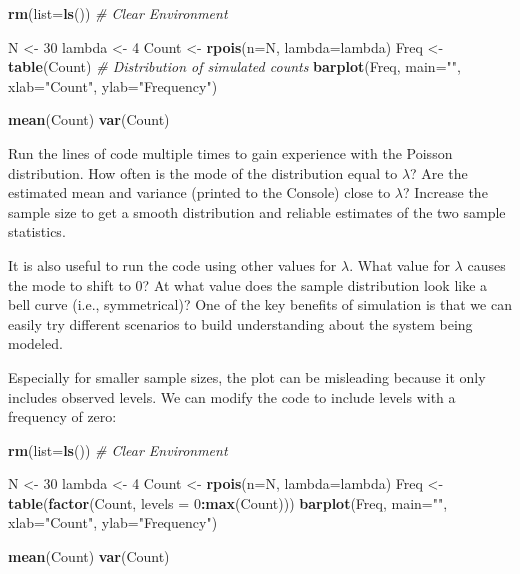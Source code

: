 \documentclass[
]{krantz}
\makeatletter
\newenvironment{Shaded}{\begin{snugshade}}{\end{snugshade}}
\newcommand{\AttributeTok}[1]{\textcolor[rgb]{0.27,0.27,0.27}{#1}}
\newcommand{\CommentTok}[1]{\textcolor[rgb]{0.37,0.37,0.37}{\textit{#1}}}
\newcommand{\DecValTok}[1]{\textcolor[rgb]{0.06,0.06,0.06}{#1}}
\newcommand{\FunctionTok}[1]{\textcolor[rgb]{0.27,0.27,0.27}{\textbf{#1}}}
\newcommand{\NormalTok}[1]{#1}
\newcommand{\OtherTok}[1]{\textcolor[rgb]{0.37,0.37,0.37}{#1}}
\newcommand{\SpecialCharTok}[1]{\textcolor[rgb]{0.43,0.43,0.43}{\textbf{#1}}}
\newcommand{\StringTok}[1]{\textcolor[rgb]{0.5,0.5,0.5}{#1}}
\newenvironment{kframe}{%
\medskip{}
\setlength{\fboxsep}{.8em}
 \def\at@end@of@kframe{}%
 \ifinner\ifhmode%
  \def\at@end@of@kframe{\end{minipage}}%
  \begin{minipage}{\columnwidth}%
 \fi\fi%
 \def\FrameCommand##1{\hskip\@totalleftmargin \hskip-\fboxsep
 \colorbox{shadecolor}{##1}\hskip-\fboxsep
     \hskip-\linewidth \hskip-\@totalleftmargin \hskip\columnwidth}%
 \MakeFramed {\advance\hsize-\width
   \@totalleftmargin\z@ \linewidth\hsize
   \@setminipage}}%
 {\par\unskip\endMakeFramed%
 \at@end@of@kframe}
\renewenvironment{Shaded}{\begin{kframe}}{\end{kframe}}
\makeatother
\begin{document}
\begin{Shaded}
\begin{Highlighting}[]
\FunctionTok{rm}\NormalTok{(}\AttributeTok{list=}\FunctionTok{ls}\NormalTok{()) }\CommentTok{\# Clear Environment}

\NormalTok{N }\OtherTok{\textless{}{-}} \DecValTok{30}
\NormalTok{lambda }\OtherTok{\textless{}{-}} \DecValTok{4}
\NormalTok{Count }\OtherTok{\textless{}{-}} \FunctionTok{rpois}\NormalTok{(}\AttributeTok{n=}\NormalTok{N, }\AttributeTok{lambda=}\NormalTok{lambda)}
\NormalTok{Freq }\OtherTok{\textless{}{-}} \FunctionTok{table}\NormalTok{(Count)  }\CommentTok{\# Distribution of simulated counts}
\FunctionTok{barplot}\NormalTok{(Freq, }\AttributeTok{main=}\StringTok{""}\NormalTok{, }\AttributeTok{xlab=}\StringTok{"Count"}\NormalTok{, }\AttributeTok{ylab=}\StringTok{"Frequency"}\NormalTok{)}

\FunctionTok{mean}\NormalTok{(Count)}
\FunctionTok{var}\NormalTok{(Count)}
\end{Highlighting}
\end{Shaded}

Run the lines of code multiple times to gain experience with the Poisson distribution. How often is the mode of the distribution equal to \(\lambda\)? Are the estimated mean and variance (printed to the Console) close to \(\lambda\)? Increase the sample size to get a smooth distribution and reliable estimates of the two sample statistics.

It is also useful to run the code using other values for \(\lambda\). What value for \(\lambda\) causes the mode to shift to 0? At what value does the sample distribution look like a bell curve (i.e., symmetrical)? One of the key benefits of simulation is that we can easily try different scenarios to build understanding about the system being modeled.

Especially for smaller sample sizes, the plot can be misleading because it only includes observed levels. We can modify the code to include levels with a frequency of zero:

\begin{Shaded}
\begin{Highlighting}[]
\FunctionTok{rm}\NormalTok{(}\AttributeTok{list=}\FunctionTok{ls}\NormalTok{()) }\CommentTok{\# Clear Environment}

\NormalTok{N }\OtherTok{\textless{}{-}} \DecValTok{30}
\NormalTok{lambda }\OtherTok{\textless{}{-}} \DecValTok{4}
\NormalTok{Count }\OtherTok{\textless{}{-}} \FunctionTok{rpois}\NormalTok{(}\AttributeTok{n=}\NormalTok{N, }\AttributeTok{lambda=}\NormalTok{lambda)}
\NormalTok{Freq }\OtherTok{\textless{}{-}} \FunctionTok{table}\NormalTok{(}\FunctionTok{factor}\NormalTok{(Count, }\AttributeTok{levels =} \DecValTok{0}\SpecialCharTok{:}\FunctionTok{max}\NormalTok{(Count)))}
\FunctionTok{barplot}\NormalTok{(Freq, }\AttributeTok{main=}\StringTok{""}\NormalTok{, }\AttributeTok{xlab=}\StringTok{"Count"}\NormalTok{, }\AttributeTok{ylab=}\StringTok{"Frequency"}\NormalTok{)}

\FunctionTok{mean}\NormalTok{(Count)}
\FunctionTok{var}\NormalTok{(Count)}
\end{Highlighting}
\end{Shaded}
\end{document}
